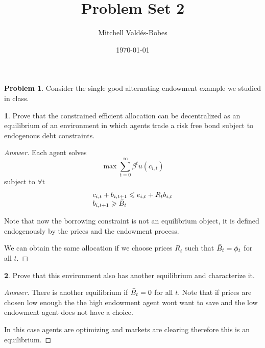 \documentclass[12pt]{article}
\title{Problem Set 2}
\author{Mitchell Valdés-Bobes}
\date{\today}
\theoremstyle{definition}
\newtheorem{problem}{Problem}
\newtheorem{subproblem}{}[problem]
\begin{document}
\maketitle

\begin{problem}
Consider the single good alternating endowment example we studied in class.

\begin{subproblem}
Prove that the constrained efficient allocation can be decentralized as an equilibrium of an environment in which agents trade a risk free bond subject to endogenous debt constraints.
\end{subproblem}
\begin{proof}[Answer]
Each agent solves
$$
\max \sum_{t=0}^{\infty} \beta^{t} u\left(c_{i, t}\right)
$$
subject to $\forall \mathrm{t}$
$$
\begin{array}{l}
c_{i, t}+b_{i, t+1} \leqslant e_{i, t}+R_{t} b_{i, t} \\
b_{i, t+1} \geqslant \Bar{B}_{t}
\end{array}
$$

Note that now the borrowing constraint is not an equilibrium object, it is defined endogenously by the prices and the endowment process. 

We can obtain the same allocation if we choose prices $R_t$ such that $\Bar{B}_{t} = \phi_t$ for all $t$.

\end{proof}

\begin{subproblem}
Prove that this environment also has another equilibrium and characterize it.
\end{subproblem}

\begin{proof}[Answer]
There is another equilibrium if  $\Bar{B}_{t} = 0$ for all $t$. Note that if prices are chosen low enough the the high endowment agent wont want to save and the low endowment agent does not have a choice.

In this case agents are optimizing and markets are clearing therefore this is an equilibrium.
\end{proof}

\end{problem}
\end{document}
